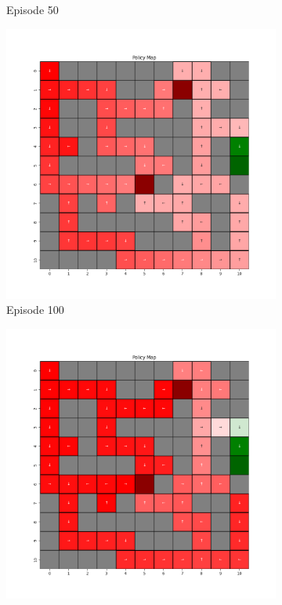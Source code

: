 \documentclass{assignment}
\begin{document}
\begin{figure}[H]
\begin{subfigure}{0.3\textwidth}
    \caption{Episode 50}
    \end{subfigure}\hfill
    \begin{subfigure}{0.3\textwidth}
        \includegraphics[width=\textwidth]{figures/policy_q/epsilon_sweep/policy_alpha_0.1_gamma_0.95_epsilon_1.0_iteration_100.png}
    \caption{Episode 100}
    \end{subfigure}
    \begin{subfigure}{0.3\textwidth}
        \includegraphics[width=\textwidth]{figures/policy_q/epsilon_sweep/policy_alpha_0.1_gamma_0.95_epsilon_1.0_iteration_1000.png}

\end{subfigure}
\end{figure}
\end{document}
